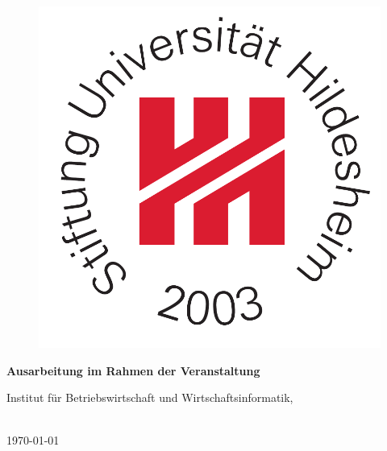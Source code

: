 \begin{titlepage}
\begin{figure}
\begin{minipage}{0.2\textwidth}
\begin{flushleft}
            \includegraphics[scale=0.25]{St_Uni-Logo-9-2003-eps-converted-to.pdf}
        \end{flushleft}
    \end{minipage} 
    \vspace{4cm}
\end{figure}
\begin{center}
    
    \Huge{\textbf{\titel}}
    
    \Huge{\textbf{\untertitel}}
    \vspace{2cm}
\end{center}
\begin{center}
    \vspace*{0cm}
    \textbf{Ausarbeitung im Rahmen der Veranstaltung \veranstaltung}
    \vspace{1cm}
\end{center}
\begin{center}
    Institut für Betriebswirtschaft und Wirtschaftsinformatik,
    
    \arbeitsgruppe
\end{center}
\begin{center}
    \vspace{5cm}
    \autor\\
    
    
    \today
\end{center}
\end{titlepage}
\newpage


